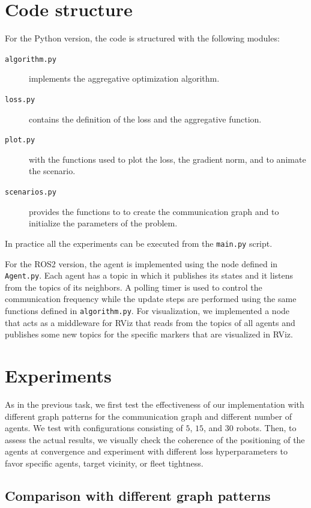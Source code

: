 \documentclass[a4paper,11pt,oneside]{book}
\begin{document}
\section{Code structure}
For the Python version, the code is structured with the following modules:
\begin{description}
      \item[\texttt{algorithm.py}] implements the aggregative optimization algorithm.
      \item[\texttt{loss.py}] contains the definition of the loss and the aggregative function.
      \item[\texttt{plot.py}] with the functions used to plot the loss, the gradient norm, and to animate the scenario.
      \item[\texttt{scenarios.py}] provides the functions to to create the communication graph and to initialize the parameters of the problem.
\end{description}
In practice all the experiments can be executed from the \texttt{main.py} script.

For the ROS2 version, the agent is implemented using the node defined in \texttt{Agent.py}. Each agent has a topic in which it publishes its states and it listens from the topics of its neighbors. A polling timer is used to control the communication frequency while the update steps are performed using the same functions defined in \texttt{algorithm.py}. For visualization, we implemented a node that acts as a middleware for RViz that reads from the topics of all agents and publishes some new topics for the specific markers that are visualized in RViz.



\section{Experiments}

As in the previous task, we first test the effectiveness of our implementation with different graph patterns for the communication graph and different number of agents. We test with configurations consisting of $5$, $15$, and $30$ robots. Then, to assess the actual results, we visually check the coherence of the positioning of the agents at convergence and experiment with different loss hyperparameters to favor specific agents, target vicinity, or fleet tightness.


\subsection{Comparison with different graph patterns}
\end{document}
